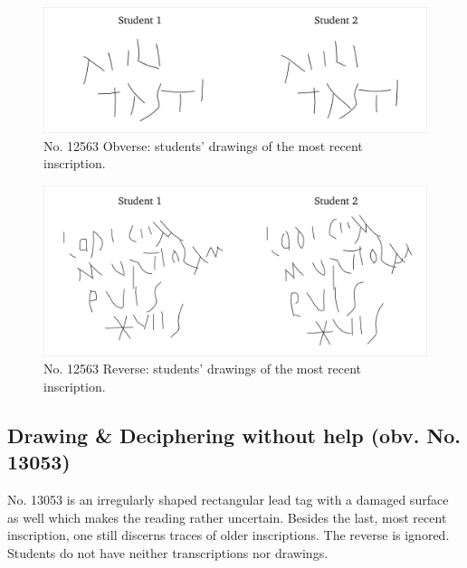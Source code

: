 \documentclass[amsthm,ebook]{saparticle}
\begin{document}
\begin{figure}[!hbp]
\centering
\includegraphics[scale=0.25]{EAGLE16lameetalteaching-img009.png}
\caption{No. 12563 Obverse: students' drawings of the most recent inscription.}
\label{fig:1}
\end{figure}

\begin{figure}[!hbp]
\centering
\includegraphics[scale=0.25]{EAGLE16lameetalteaching-img008.png}
\caption{No. 12563 Reverse: students' drawings of the most recent inscription.}
\label{fig:2}
\end{figure}



\subsection{Drawing \& Deciphering without help (obv. No. 13053)}


No. 13053 is an irregularly shaped rectangular lead tag with a damaged surface as well which makes the reading rather
uncertain. Besides the last, most recent inscription, one still discerns traces of older inscriptions. The reverse is
ignored. Students do not have neither transcriptions nor drawings.

\end{document}
